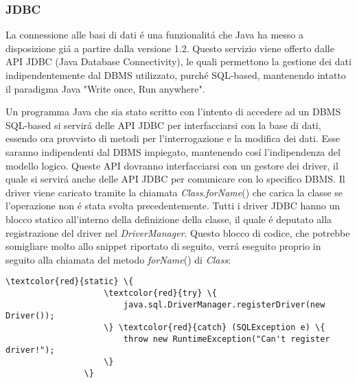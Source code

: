 \documentclass[12pt,a4paper,onecolumn]{article}
\begin{document}
\newpage

		\subsubsection{JDBC}
		\begin{flushleft}
				La connessione alle basi di dati \'{e} una funzionalit\'{a} che Java ha messo a disposizione gi\'{a} a partire dalla versione 1.2. Questo servizio viene offerto dalle API JDBC (Java Database Connectivity), le quali permettono la gestione dei dati indipendentemente dal DBMS utilizzato, purch\'{e} SQL-based, mantenendo intatto il paradigma Java "Write once, Run anywhere".\newline
				
				Un programma Java che sia stato scritto con l'intento di accedere ad un DBMS SQL-based si servir\'{a} delle API JDBC per interfacciarsi con la base di dati, essendo ora provvisto di metodi per l'interrogazione e la modifica dei dati. Esse saranno indipendenti dal DBMS impiegato, mantenendo cos\'{i} l'indipendenza del modello logico.\newline
				Queste API dovranno interfacciarsi con un gestore dei driver, il quale si servir\'{a} anche delle API JDBC per comunicare con lo specifico DBMS.
				Il driver viene caricato tramite la chiamata \textit{Class}.\textit{forName}() che carica la classe se l'operazione non \'{e} stata svolta precedentemente. Tutti i driver JDBC hanno un blocco statico all'interno della definizione della classe, il quale \'{e} deputato alla registrazione del driver nel \textit{DriverManager}. Questo blocco di codice, che potrebbe somigliare molto allo snippet riportato di seguito, verr\'{a} eseguito proprio in seguito alla chiamata del metodo \textit{forName}() di \textit{Class}:
		\end{flushleft}
				
				\begin{Verbatim}[label={Snippet da \cite{JDBCDriver}}]
				\textcolor{red}{static} \{ 
				    \textcolor{red}{try} \{
					    java.sql.DriverManager.registerDriver(new Driver());
				    \} \textcolor{red}{catch} (SQLException e) \{
				        throw new RuntimeException("Can't register driver!");
				    \}
				\}
				\end{Verbatim}
				
\end{document}
